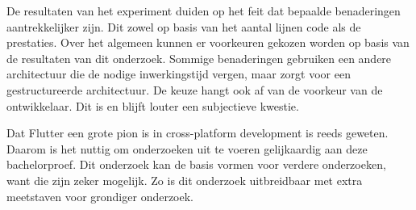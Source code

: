 De resultaten van het experiment duiden op het feit dat bepaalde benaderingen aantrekkelijker zijn. Dit zowel op basis van het aantal lijnen code als de prestaties. Over het algemeen kunnen er voorkeuren gekozen worden op basis van de resultaten van dit onderzoek. Sommige benaderingen gebruiken een andere architectuur die de nodige inwerkingstijd vergen, maar zorgt voor een gestructureerde architectuur. De keuze hangt ook af van de voorkeur van de ontwikkelaar. Dit is en blijft louter een subjectieve kwestie.\newline

Dat Flutter een grote pion is in cross-platform development is reeds geweten. Daarom is het nuttig om onderzoeken uit te voeren gelijkaardig aan deze bachelorproef. Dit onderzoek kan de basis vormen voor verdere onderzoeken, want die zijn zeker mogelijk. Zo is dit onderzoek uitbreidbaar met extra meetstaven voor grondiger onderzoek.
